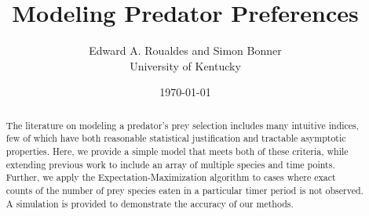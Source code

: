 \documentclass[12pt]{article}
\begin{document}
\title{Modeling Predator Preferences}
\author{Edward A. Roualdes and Simon Bonner \\ University of Kentucky}
\date{\today}
\maketitle

\begin{abstract}
The literature on modeling a predator's prey selection includes many intuitive indices, few of which have both reasonable statistical justification and tractable asymptotic properties.  Here, we provide a simple model that meets both of these criteria, while extending previous work to include an array of multiple species and time points.  Further, we apply the Expectation-Maximization algorithm to cases where exact counts of the number of prey species eaten in a particular timer period is not observed.  A simulation is provided to demonstrate the accuracy of our methods.
\end{abstract}










\end{document}
